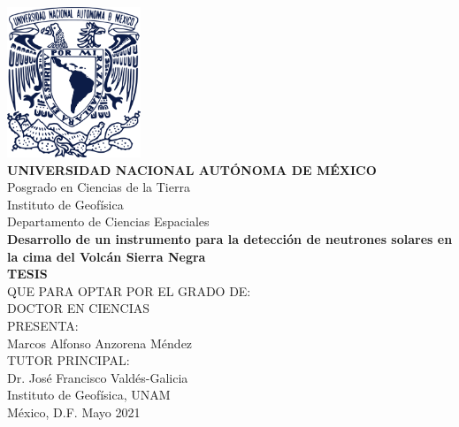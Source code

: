 \begin{titlepage}

\begin{center}

	\vspace{-1cm}
  \includegraphics[height=4.5cm]{unam.pdf}\\[20pt]
	\textbf{\Large UNIVERSIDAD NACIONAL AUTÓNOMA DE MÉXICO}\\
	\large Posgrado en Ciencias de la Tierra\\
	\large Instituto de Geofísica\\
	\large Departamento de Ciencias Espaciales\\[35pt]
	\textbf{\Large Desarrollo de un instrumento para la detección de neutrones solares en la cima
	del Volcán Sierra Negra}\\[40pt]
	\textbf{\Large TESIS}\\[10pt]
  \large QUE PARA OPTAR POR EL GRADO DE:\\
  \large DOCTOR EN CIENCIAS\\[25pt]
  \large PRESENTA:\\
	\large  Marcos Alfonso Anzorena Méndez\\[30pt]
  \large TUTOR PRINCIPAL:\\
  \large  Dr. José Francisco Valdés-Galicia\\
  \large  Instituto de Geofísica, UNAM\\[35pt]
  México, D.F. Mayo 2021

\end{center}








\end{titlepage}
